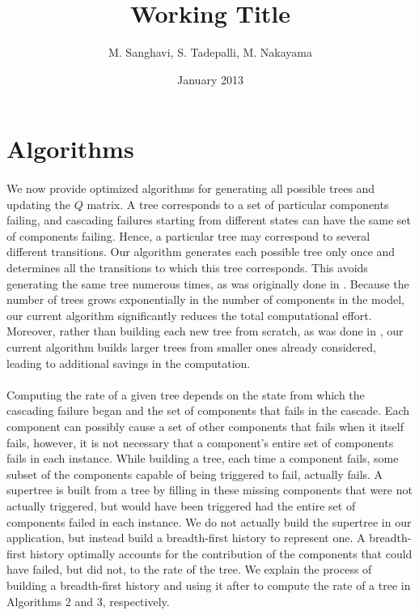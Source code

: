 \documentclass[12pt]{article}
\author{M. Sanghavi, S. Tadepalli, M. Nakayama}
\date{January 2013}
\begin{document}
\title{Working Title}
\maketitle



\section{Algorithms}
\label{sec:alg}

\paragraph{} We now provide optimized algorithms for generating all possible trees and updating the $Q$ matrix. A tree corresponds to a set of particular components failing, and cascading failures starting from different states can have the same set of components failing. Hence, a particular tree may correspond to several different transitions. Our algorithm generates each possible tree only once and determines all the transitions to which this tree corresponds.  This avoids generating the same tree numerous times, as was originally done in \cite{ING:2009}.  Because the number of trees grows exponentially in the number of components in the model, our current algorithm significantly reduces the total computational effort. Moreover, rather than building each new tree from scratch, as was done in \cite{ING:2009}, our current algorithm builds larger trees from smaller ones already considered, leading to additional savings in the computation. 

\paragraph{} Computing the rate of a given tree depends on the state from which the cascading failure began and the set of components that fails in the cascade. Each component can possibly cause a set of other components that fails when it itself fails, however, it is not necessary that a component's entire set of components fails in each instance. While building a tree, each time a component fails, some subset of the components capable of being triggered to fail, actually fails. A supertree is built from a tree by filling in these missing components that were not actually triggered, but would have been triggered had the entire set of components failed in each instance. We do not actually build the supertree in our application, but instead build a breadth-first history to represent one. A breadth-first history optimally accounts for the contribution of the components that could have failed, but did not, to the rate of the tree. We explain the process of building a breadth-first history and using it after to compute the rate of a tree in Algorithms 2 and 3, respectively. 
\end{document}
